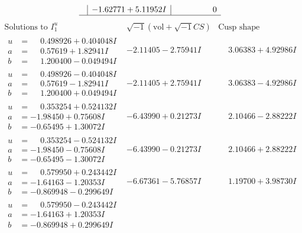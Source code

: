 \documentclass[1p]{elsarticle_modified}
\theoremstyle{definition}
\newcommand{\I}{\sqrt{-1}}
\begin{document}
$$\begin{array}{c|c|c}
 & -1.62771 + 5.11952 I & \phantom{-0.000000 } 0\\
 \hline 
 \end{array}$$\newpage$$\begin{array}{c|c|c}  
\text{Solutions to }I^u_{1}& \I (\text{vol} + \sqrt{-1}CS) & \text{Cusp shape}\\
 \hline 
\begin{aligned}
u &= \phantom{-}0.498926 + 0.404048 I \\
a &= \phantom{-}0.57619 + 1.82941 I \\
b &= \phantom{-}1.200400 - 0.049494 I\end{aligned}
 & -2.11405 - 2.75941 I & \phantom{-}3.06383 + 4.92986 I \\ \hline\begin{aligned}
u &= \phantom{-}0.498926 - 0.404048 I \\
a &= \phantom{-}0.57619 - 1.82941 I \\
b &= \phantom{-}1.200400 + 0.049494 I\end{aligned}
 & -2.11405 + 2.75941 I & \phantom{-}3.06383 - 4.92986 I \\ \hline\begin{aligned}
u &= \phantom{-}0.353254 + 0.524132 I \\
a &= -1.98450 + 0.75608 I \\
b &= -0.65495 + 1.30072 I\end{aligned}
 & -6.43990 + 0.21273 I & \phantom{-}2.10466 - 2.88222 I \\ \hline\begin{aligned}
u &= \phantom{-}0.353254 - 0.524132 I \\
a &= -1.98450 - 0.75608 I \\
b &= -0.65495 - 1.30072 I\end{aligned}
 & -6.43990 - 0.21273 I & \phantom{-}2.10466 + 2.88222 I \\ \hline\begin{aligned}
u &= \phantom{-}0.579950 + 0.243442 I \\
a &= -1.64163 - 1.20353 I \\
b &= -0.869948 - 0.299649 I\end{aligned}
 & -6.67361 - 5.76857 I & \phantom{-}1.19700 + 3.98730 I \\ \hline\begin{aligned}
u &= \phantom{-}0.579950 - 0.243442 I \\
a &= -1.64163 + 1.20353 I \\
b &= -0.869948 + 0.299649 I\end{aligned}

\end{array}$$
\end{document}
